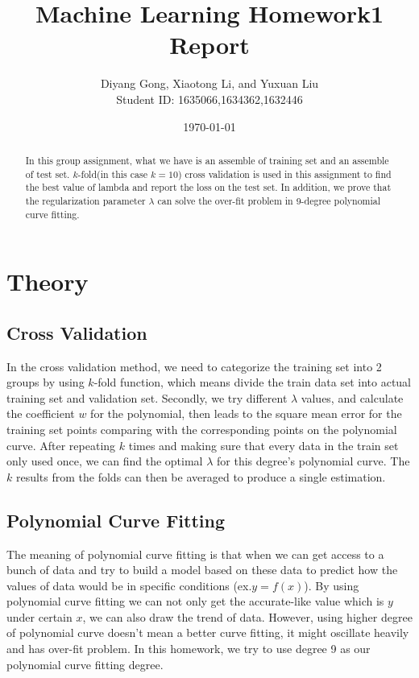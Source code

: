 \documentclass[letterpaper,12pt]{article}
\numberwithin{equation}{section}
\begin{document}
\title{Machine Learning Homework1 Report}
\author{Diyang Gong, Xiaotong Li, and Yuxuan Liu \\
Student ID: 1635066,1634362,1632446}
\date{\today}
\maketitle


\begin{abstract}
In this group assignment, what we have is an assemble of training set and an assemble of test set. $k$-fold(in this case $k=10$) cross validation is used in this assignment to find the best value of lambda and report the loss on the test set. In addition, we prove that the regularization parameter $\lambda$ can solve the over-fit problem in 9-degree polynomial curve fitting.
\end{abstract}




\section{Theory}
\subsection{Cross Validation}

In the cross validation method, we need to categorize the training set into 2 groups by using $k$-fold function, which means divide the train data set into actual training set and validation set. Secondly, we try different $\lambda$ values, and calculate the coefficient $w$ for the polynomial, then leads to the square mean error for the training set points comparing with the corresponding points on the polynomial curve. After repeating $k$ times and making sure that every data in the train set only used once, we can find the optimal $\lambda$ for this degree's polynomial curve. The $k$ results from the folds can then be averaged to produce a single estimation\cite{mclachlan2005analyzing}.%


\subsection{Polynomial Curve Fitting}
The meaning of polynomial curve fitting is that when we can get access to a bunch of data and try to build a model based on these data to predict how the values of data would be in specific conditions (ex.$y = f(x)$). By using polynomial curve fitting we can not only get the accurate-like value which is $y$ under certain $x$, we can also draw the trend of data. However, using higher degree of polynomial curve doesn't mean a better curve fitting, it might oscillate heavily and has over-fit problem. In this homework, we try to use degree 9 as our polynomial curve fitting degree.
\end{document}
